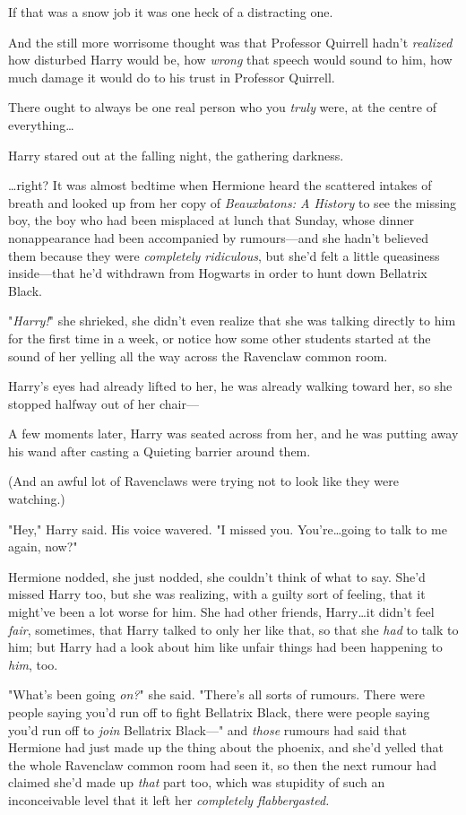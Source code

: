 If that was a snow job it was one heck of a distracting one.

And the still more worrisome thought was that Professor Quirrell hadn't
\emph{realized} how disturbed Harry would be, how \emph{wrong} that speech
would sound to him, how much damage it would do to his trust in Professor
Quirrell.

There ought to always be one real person who you \emph{truly} were, at the
centre of everything…

Harry stared out at the falling night, the gathering darkness.

…right?
\later
It was almost bedtime when Hermione heard the scattered intakes of breath and
looked up from her copy of \emph{Beauxbatons: A History} to see the missing
boy, the boy who had been misplaced at lunch that Sunday, whose dinner
nonappearance had been accompanied by rumours—and she hadn't believed them
because they were \emph{completely ridiculous}, but she'd felt a little
queasiness inside—that he'd withdrawn from Hogwarts in order to hunt down
Bellatrix Black.

"\emph{Harry!}" she shrieked, she didn't even realize that she was talking
directly to him for the first time in a week, or notice how some other students
started at the sound of her yelling all the way across the Ravenclaw common
room.

Harry's eyes had already lifted to her, he was already walking toward her, so
she stopped halfway out of her chair—

A few moments later, Harry was seated across from her, and he was putting away
his wand after casting a Quieting barrier around them.

(And an awful lot of Ravenclaws were trying not to look like they were
watching.)

"Hey," Harry said. His voice wavered. "I missed you. You're…going to
talk to me again, now?"

Hermione nodded, she just nodded, she couldn't think of what to say. She'd
missed Harry too, but she was realizing, with a guilty sort of feeling, that it
might've been a lot worse for him. She had other friends, Harry…it
didn't feel \emph{fair}, sometimes, that Harry talked to only her like that, so
that she \emph{had} to talk to him; but Harry had a look about him like unfair
things had been happening to \emph{him}, too.

"What's been going \emph{on?}" she said. "There's all sorts of rumours. There
were people saying you'd run off to fight Bellatrix Black, there were people
saying you'd run off to \emph{join} Bellatrix Black—" and \emph{those} rumours
had said that Hermione had just made up the thing about the phoenix, and she'd
yelled that the whole Ravenclaw common room had seen it, so then the next rumour
had claimed she'd made up \emph{that} part too, which was stupidity of such an
inconceivable level that it left her \emph{completely flabbergasted.}


